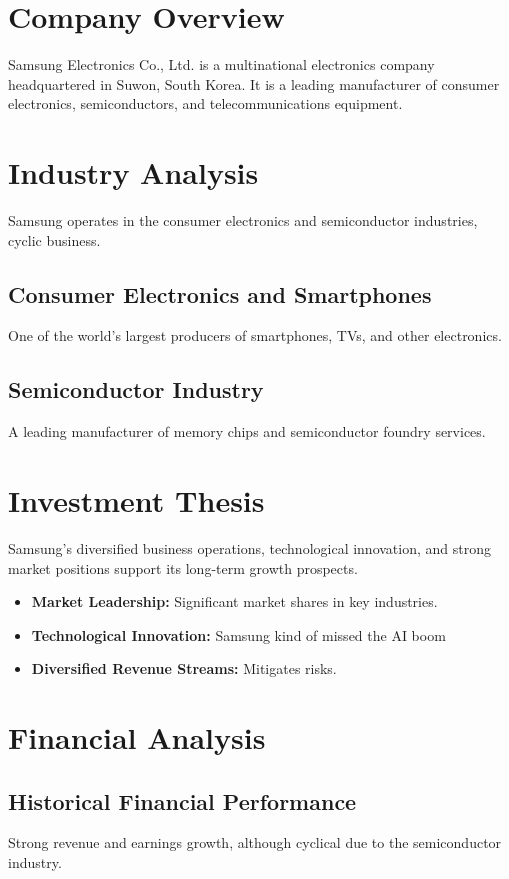 \documentclass[12pt]{report}
\begin{document}
\section{Company Overview}
Samsung Electronics Co., Ltd. is a multinational electronics company headquartered in Suwon, South Korea. It is a leading manufacturer of consumer electronics, semiconductors, and telecommunications equipment.

\section{Industry Analysis}
Samsung operates in the consumer electronics and semiconductor industries, cyclic business.

\subsection{Consumer Electronics and Smartphones}
One of the world's largest producers of smartphones, TVs, and other electronics.

\subsection{Semiconductor Industry}
A leading manufacturer of memory chips and semiconductor foundry services.

\section{Investment Thesis}
Samsung's diversified business operations, technological innovation, and strong market positions support its long-term growth prospects.

\begin{itemize}
    \item \textbf{Market Leadership:} Significant market shares in key industries.
    \item \textbf{Technological Innovation:} Samsung kind of missed the AI boom
    \item \textbf{Diversified Revenue Streams:} Mitigates risks.
\end{itemize}

\section{Financial Analysis}
\subsection{Historical Financial Performance}
Strong revenue and earnings growth, although cyclical due to the semiconductor industry.
\end{document}
